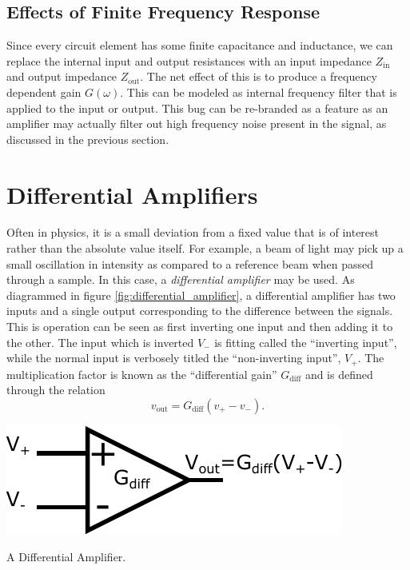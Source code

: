 \documentclass{tufte-book}
\begin{document}
\subsection{Effects of Finite Frequency Response}
Since every circuit element has some finite capacitance and inductance, we can replace the internal input and output resistances with an input impedance $Z_\text{in}$ and output impedance $Z_\text{out}$. The net effect of this is to produce a frequency dependent gain $G(\omega)$. This can be modeled as internal frequency filter that is applied to the input or output. This bug can be re-branded as a feature as an amplifier may actually filter out high frequency noise present in the signal, as discussed in the previous section.

\section{Differential Amplifiers}
\label{sec:diff_amps}
Often in physics, it is a small deviation from a fixed value that is of interest rather than the absolute value itself. For example, a beam of light may pick up a small oscillation in intensity as compared to a reference beam when passed through a sample. In this case, a \textit{differential amplifier} may be used. As diagrammed in figure \ref{fig:differential_amplifier}, a differential amplifier has two inputs and a single output corresponding to the difference between the signals. This is operation can be seen as first inverting one input and then adding it to the other. The input which is inverted $V_-$ is fitting called the ``inverting input'', while the normal input is verbosely titled the ``non-inverting input'', $V_+$. The multiplication factor is known as the ``differential gain'' $G_\text{diff}$ and is defined through the relation
\begin{equation}
\label{eq:def_diff_amp}
v_\text{out} = G_\text{diff}\left(v_+-v_-\right).
\end{equation}


\begin{marginfigure}%
  \includegraphics[width=\linewidth]{differential_amplifier}
  \caption{A Differential Amplifier.}
  \label{fig:differential_amplifier}
\end{marginfigure}
\end{document}
